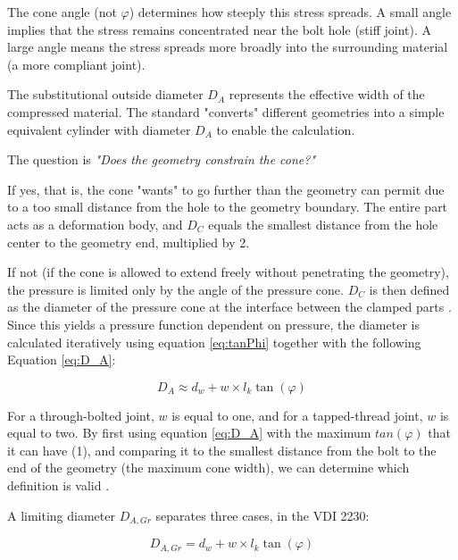 \documentclass[a4paper,twoside]{bth}
\begin{document}
The cone angle (not $\varphi$) determines how steeply this stress spreads. A small angle implies that the stress remains concentrated near the bolt hole (stiff joint). A large angle means the stress spreads more broadly into the surrounding material (a more compliant joint). 

The substitutional outside diameter $D_A$ represents the effective width of the compressed material. The standard "converts" different geometries into a simple equivalent cylinder with diameter $D_A$ to enable the calculation.

The question is \textit{"Does the geometry constrain the cone?"}

If yes, that is, the cone "wants" to go further than the geometry can permit due to a too small distance from the hole to the geometry boundary. The entire part acts as a deformation body, and $D_C$ equals the smallest distance from the hole center to the geometry end, multiplied by 2.

If not (if the cone is allowed to extend freely without penetrating the geometry), the pressure is limited only by the angle of the pressure cone. $D_C$ is then defined as the diameter of the pressure cone at the interface between the clamped parts \cite{VDI}. Since this yields a pressure function dependent on pressure, the diameter is calculated iteratively using equation \ref{eq:tanPhi} together with the following Equation \ref{eq:D_A}:

\begin{equation} \label{eq:D_A}
    D_A \approx d_w + w\times l_k \tan(\varphi)
\end{equation}

For a through-bolted joint, $w$ is equal to one, and for a tapped-thread joint, $w$ is equal to two. By first using equation \ref{eq:D_A} with the maximum $tan(\varphi)$ that it can have (1), and comparing it to the smallest distance from the bolt to the end of the geometry (the maximum cone width), we can determine which definition is valid \cite{VDI}.

A limiting diameter $D_{A, Gr}$ separates three cases, in the VDI 2230:

\begin{equation} \label{eq:D_AGR}
    D_{A, Gr} = d_w + w\times l_k \tan(\varphi)
\end{equation}
\end{document}
